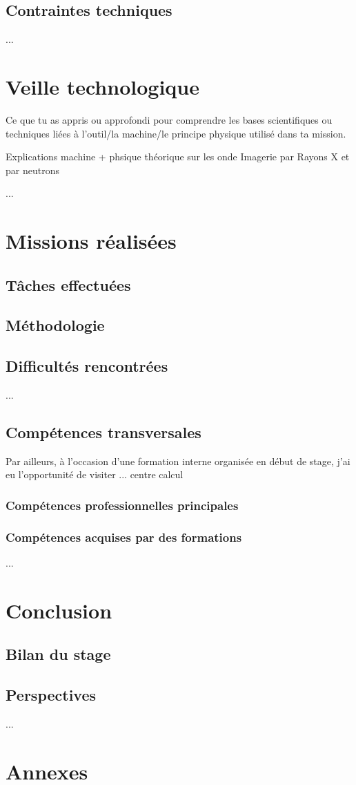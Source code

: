 \documentclass[12pt,a4paper]{report}
\begin{document}
\section{Contraintes techniques}
... %

\chapter{Veille technologique}
Ce que tu as appris ou approfondi pour comprendre les bases scientifiques ou techniques liées à l’outil/la machine/le principe physique utilisé dans ta mission.

Explications machine + phsique théorique sur les onde
Imagerie par Rayons X et par neutrons

... %

\chapter{Missions réalisées}
\section{Tâches effectuées}
\section{Méthodologie}
\section{Difficultés rencontrées}
... %


\section{Compétences transversales}
Par ailleurs, à l’occasion d’une formation interne organisée en début de stage, j’ai eu l’opportunité de visiter ... centre calcul

\subsection{Compétences professionnelles principales}
\subsection{Compétences acquises par des formations}


... %

\chapter{Conclusion}
\section{Bilan du stage}
\section{Perspectives}
... %

\appendix
\chapter{Annexes}
\end{document}
